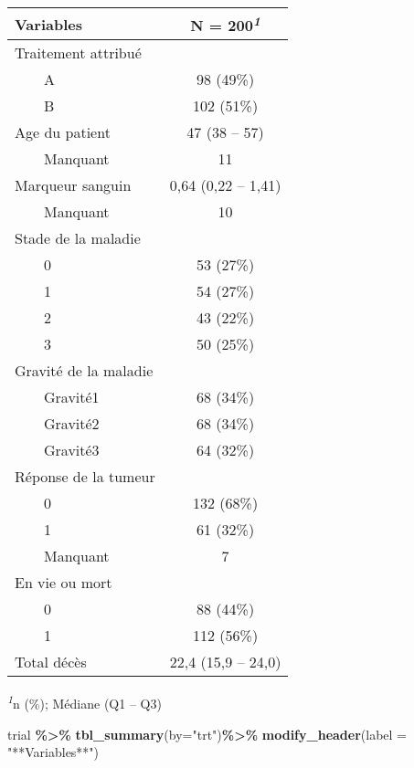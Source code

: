 \documentclass[
]{article}
\newenvironment{Shaded}{\begin{snugshade}}{\end{snugshade}}
\newcommand{\AttributeTok}[1]{\textcolor[rgb]{0.13,0.29,0.53}{#1}}
\newcommand{\FunctionTok}[1]{\textcolor[rgb]{0.13,0.29,0.53}{\textbf{#1}}}
\newcommand{\NormalTok}[1]{#1}
\newcommand{\SpecialCharTok}[1]{\textcolor[rgb]{0.81,0.36,0.00}{\textbf{#1}}}
\newcommand{\StringTok}[1]{\textcolor[rgb]{0.31,0.60,0.02}{#1}}
\begin{document}
\begin{table}[!t]
\fontsize{12.0pt}{14.4pt}\selectfont
\begin{tabular*}{\linewidth}{@{\extracolsep{\fill}}lc}
\toprule
\textbf{Variables} & \textbf{N = 200}\textsuperscript{\textit{1}} \\ 
\midrule\addlinespace[2.5pt]
Traitement attribué &  \\ 
    A & 98 (49\%) \\ 
    B & 102 (51\%) \\ 
Age du patient & 47 (38 – 57) \\ 
    Manquant & 11 \\ 
Marqueur sanguin & 0,64 (0,22 – 1,41) \\ 
    Manquant & 10 \\ 
Stade de la maladie &  \\ 
    0 & 53 (27\%) \\ 
    1 & 54 (27\%) \\ 
    2 & 43 (22\%) \\ 
    3 & 50 (25\%) \\ 
Gravité de la maladie &  \\ 
    Gravité1 & 68 (34\%) \\ 
    Gravité2 & 68 (34\%) \\ 
    Gravité3 & 64 (32\%) \\ 
Réponse de la tumeur &  \\ 
    0 & 132 (68\%) \\ 
    1 & 61 (32\%) \\ 
    Manquant & 7 \\ 
En vie ou mort &  \\ 
    0 & 88 (44\%) \\ 
    1 & 112 (56\%) \\ 
Total décès & 22,4 (15,9 – 24,0) \\ 
\bottomrule
\end{tabular*}
\begin{minipage}{\linewidth}
\textsuperscript{\textit{1}}n (\%); Médiane (Q1 -- Q3)\\
\end{minipage}
\end{table}

\begin{Shaded}
\begin{Highlighting}[]
\NormalTok{trial }\SpecialCharTok{\%\textgreater{}\%}
  \FunctionTok{tbl\_summary}\NormalTok{(}\AttributeTok{by=}\StringTok{"trt"}\NormalTok{)}\SpecialCharTok{\%\textgreater{}\%}
  \FunctionTok{modify\_header}\NormalTok{(}\AttributeTok{label =} \StringTok{"**Variables**"}\NormalTok{)}
\end{Highlighting}
\end{Shaded}
\end{document}
